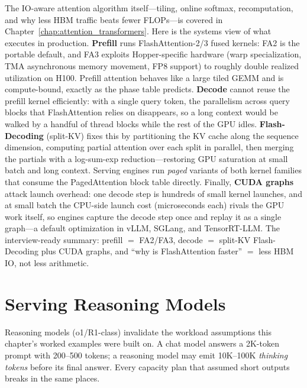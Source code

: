 The IO-aware attention algorithm itself---tiling, online softmax, recomputation, and why less HBM traffic beats fewer FLOPs---is covered in Chapter~\ref{chap:attention_transformers}. Here is the systems view of what executes in production. \textbf{Prefill} runs FlashAttention-2/3 fused kernels: FA2 is the portable default, and FA3 exploits Hopper-specific hardware (warp specialization, TMA asynchronous memory movement, FP8 support) to roughly double realized utilization on H100. Prefill attention behaves like a large tiled GEMM and is compute-bound, exactly as the phase table predicts. \textbf{Decode} cannot reuse the prefill kernel efficiently: with a single query token, the parallelism across query blocks that FlashAttention relies on disappears, so a long context would be walked by a handful of thread blocks while the rest of the GPU idles. \textbf{Flash-Decoding} (split-KV) fixes this by partitioning the KV cache along the sequence dimension, computing partial attention over each split in parallel, then merging the partials with a log-sum-exp reduction---restoring GPU saturation at small batch and long context. Serving engines run \textit{paged} variants of both kernel families that consume the PagedAttention block table directly. Finally, \textbf{CUDA graphs} attack launch overhead: one decode step is hundreds of small kernel launches, and at small batch the CPU-side launch cost (microseconds each) rivals the GPU work itself, so engines capture the decode step once and replay it as a single graph---a default optimization in vLLM, SGLang, and TensorRT-LLM. The interview-ready summary: prefill $=$ FA2/FA3, decode $=$ split-KV Flash-Decoding plus CUDA graphs, and ``why is FlashAttention faster'' $=$ less HBM IO, not less arithmetic.

\section{Serving Reasoning Models}
\label{sec:serving_reasoning}

Reasoning models (o1/R1-class) invalidate the workload assumptions this chapter's worked examples were built on. A chat model answers a 2K-token prompt with 200--500 tokens; a reasoning model may emit 10K--100K \textit{thinking tokens} before its final answer. Every capacity plan that assumed short outputs breaks in the same places.

